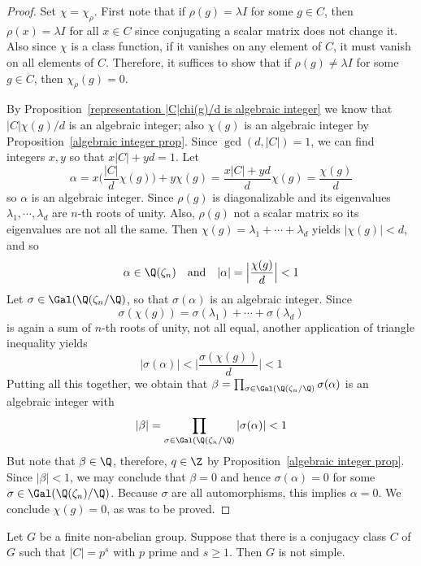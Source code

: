 \begin{proof}
Set $\chi=\chi_\rho$. First note that if $\rho(g)=\lambda I$ for some $g\in C$, then $\rho(x)=\lambda I$ for all $x\in C$ since conjugating a scalar matrix does not change it. Also since $\chi$ is a class function, if it vanishes on any element of $C$, it must vanish on all elements of $C$. Therefore, it suffices to show that if $\rho(g)\neq\lambda I$ for some $g\in C$, then $\chi_\rho(g)=0$.\par
By Proposition~\ref{representation |C|chi(g)/d is algebraic integer} we know that $|C|\chi(g)/d$ is an algebraic integer; also $\chi(g)$ is an algebraic integer by Proposition~\ref{algebraic integer prop}. Since $\gcd(d,|C|)=1$, we can find integers $x,y$ so that $x|C|+yd=1$. Let
\[\alpha=x\Big(\frac{|C|}{d}\chi(g)\Big)+y\chi(g)=\frac{x|C|+yd}{d}\chi(g)=\frac{\chi(g)}{d}\]
so $\alpha$ is an algebraic integer. Since $\rho(g)$ is diagonalizable and its eigenvalues $\lambda_1,\cdots,\lambda_d$ are $n$-th roots of unity. Also, $\rho(g)$ not a scalar matrix so its eigenvalues are not all the same. Then $\chi(g)=\lambda_1+\cdots+\lambda_d$ yields $|\chi(g)|<d$, and so
\[\alpha\in\Q(\zeta_n)\quad\text{and}\quad |\alpha|=\Big|\frac{\chi(g)}{d}\Big|<1\]
Let $\sigma\in\Gal(\Q(\zeta_n/\Q)$, so that $\sigma(\alpha)$ is an algebraic integer. Since
\[\sigma(\chi(g))=\sigma(\lambda_1)+\cdots+\sigma(\lambda_d)\]
is again a sum of $n$-th roots of unity, not all equal, another application of triangle inequality yields \[|\sigma(\alpha)|<\Big|\frac{\sigma(\chi(g))}{d}\Big|<1\]
Putting all this together, we obtain that $\beta=\prod_{\sigma\in\Gal(\Q(\zeta_n/\Q)}\sigma(\alpha)$ is an algebraic integer with
\[|\beta|=\prod_{\sigma\in\Gal(\Q(\zeta_n/\Q)}|\sigma(\alpha)|<1\]
But note that $\beta\in\Q$, therefore, $q\in\Z$ by Proposition~\ref{algebraic integer prop}. Since $|\beta|<1$, we may conclude that $\beta=0$ and hence $\sigma(\alpha)=0$ for some $\sigma\in\Gal(\Q(\zeta_n)/\Q)$. Because $\sigma$ are all automorphisms, this implies $\alpha=0$. We conclude $\chi(g)=0$, as was to be proved.
\end{proof}
\begin{lemma}\label{simple group lem}
Let $G$ be a finite non-abelian group. Suppose that there is a conjugacy class $C$ of $G$ such that $|C|=p^s$ with $p$ prime and $s\geq 1$. Then $G$ is not simple.
\end{lemma}
